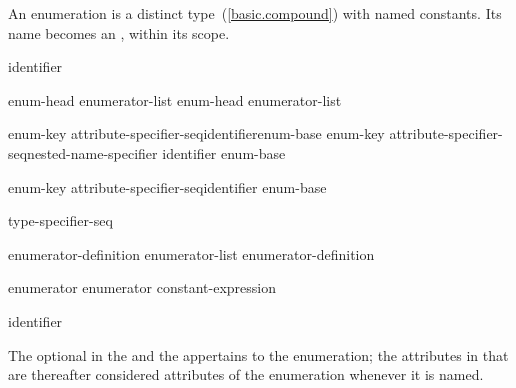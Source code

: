 \pnum
An enumeration is a distinct type~(\ref{basic.compound}) with named
constants. Its name becomes an , within its scope.

\begin{bnf}
\br
    identifier
\end{bnf}

\begin{bnf}
\br
    enum-head \terminal{\{} enumerator-list\opt \terminal{\}}\br
    enum-head \terminal{\{} enumerator-list \terminal{, \}}
\end{bnf}

\begin{bnf}
\br
    enum-key attribute-specifier-seq\opt identifier\opt enum-base\opt\br
    enum-key attribute-specifier-seq\opt nested-name-specifier identifier\br
\hspace*{\bnfindentinc}enum-base\opt
\end{bnf}

\begin{bnf}
\br
    enum-key attribute-specifier-seq\opt identifier enum-base\opt \terminal{;}
\end{bnf}

\begin{bnf}
\br
    \br
    \br
\end{bnf}

\begin{bnf}
\br
    \terminal{:} type-specifier-seq
\end{bnf}

\begin{bnf}
\br
    enumerator-definition\br
    enumerator-list \terminal{,} enumerator-definition
\end{bnf}

\begin{bnf}
\br
    enumerator\br
    enumerator \terminal{=} constant-expression
\end{bnf}

\begin{bnf}
\br
    identifier
\end{bnf}

The optional  in the  and
the  appertains to the enumeration; the attributes
in that  are thereafter considered attributes of the
enumeration whenever it is named.

